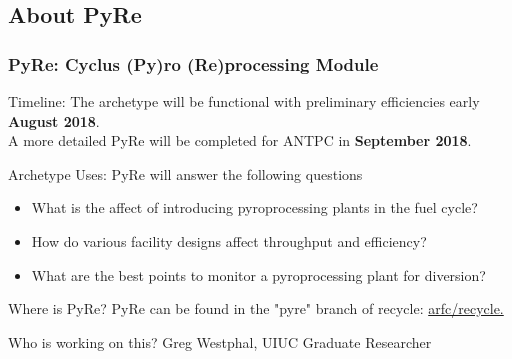 \subsection{About PyRe}
\begin{frame}
\frametitle{PyRe: Cyclus (Py)ro (Re)processing Module}
\begin{block}{Timeline:} 
	The archetype will be functional with preliminary efficiencies early \textbf{August 2018}. \\
	A more detailed PyRe will be completed for ANTPC in \textbf{September 2018}.
\end{block}
\begin{block}{Archetype Uses:} 
	PyRe will answer the following questions
	\begin{itemize}
		\item What is the affect of introducing pyroprocessing plants in the fuel cycle?
		\item How do various facility designs affect throughput and efficiency?
		\item What are the best points to monitor a pyroprocessing plant for diversion?
	\end{itemize}
\end{block}
\begin{block}{Where is PyRe?} 
	PyRe can be found in the "pyre" branch of recycle: 	\href{https://github.com/arfc/recycle}{arfc/recycle.} 
\end{block}
\begin{block}{Who is working on this?}
	Greg Westphal, UIUC Graduate Researcher
\end{block}
\end{frame}

